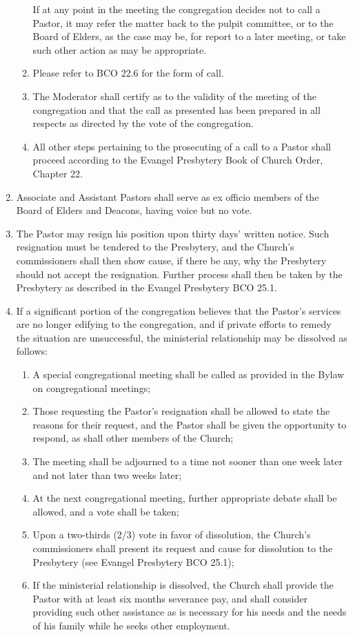 \documentclass[
]{book}
\providecommand{\tightlist}{%
  \setlength{\itemsep}{0pt}\setlength{\parskip}{0pt}}
\begin{document}
\begin{enumerate}
\begin{enumerate}
    If at any point in the meeting the congregation decides not to call a Pastor, it may refer the matter back to the pulpit committee, or to the Board of Elders, as the case may be, for report to a later meeting, or take such other action as may be appropriate.
  \item
    Please refer to BCO 22.6 for the form of call.
  \item
    The Moderator shall certify as to the validity of the meeting of the congregation and that the call as presented has been prepared in all respects as directed by the vote of the congregation.
  \item
    All other steps pertaining to the prosecuting of a call to a Pastor shall proceed according to the Evangel Presbytery Book of Church Order, Chapter 22.
  \end{enumerate}
\item
  Associate and Assistant Pastors shall serve as ex officio members of the Board of Elders and Deacons, having voice but no vote.
\item
  The Pastor may resign his position upon thirty days' written notice. Such resignation must be tendered to the Presbytery, and the Church's commissioners shall then show cause, if there be any, why the Presbytery should not accept the resignation. Further process shall then be taken by the Presbytery as described in the Evangel Presbytery BCO 25.1.
\item
  If a significant portion of the congregation believes that the Pastor's services are no longer edifying to the congregation, and if private efforts to remedy the situation are unsuccessful, the ministerial relationship may be dissolved as follows:

  \begin{enumerate}
  \def\labelenumii{(\arabic{enumii})}
  \tightlist
  \item
    A special congregational meeting shall be called as provided in the Bylaw on congregational meetings;
  \item
    Those requesting the Pastor's resignation shall be allowed to state the reasons for their request, and the Pastor shall be given the opportunity to respond, as shall other members of the Church;
  \item
    The meeting shall be adjourned to a time not sooner than one week later and not later than two weeks later;
  \item
    At the next congregational meeting, further appropriate debate shall be allowed, and a vote shall be taken;
  \item
    Upon a two-thirds (2/3) vote in favor of dissolution, the Church's commissioners shall present its request and cause for dissolution to the Presbytery (see Evangel Presbytery BCO 25.1);
  \item
    If the ministerial relationship is dissolved, the Church shall provide the Pastor with at least six months severance pay, and shall consider providing such other assistance as is necessary for his needs and the needs of his family while he seeks other employment.
  \end{enumerate}
\end{enumerate}
\end{document}
